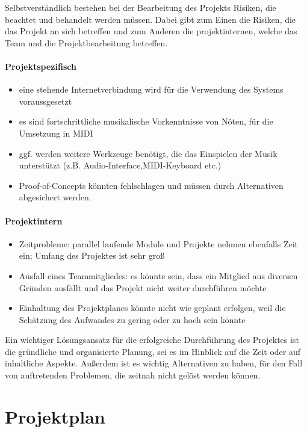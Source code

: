 \documentclass[12pt]{scrartcl}
\begin{document}


Selbstverständlich bestehen bei der Bearbeitung des Projekts Risiken, die beachtet und behandelt werden müssen. Dabei gibt zum Einen die Risiken, die das Projekt an sich betreffen und zum Anderen die projektinternen, welche das Team und die Projektbearbeitung betreffen.

\paragraph{Projektspezifisch}
\begin{itemize}
\item eine stehende Internetverbindung wird für die Verwendung des Systems voraussgesetzt
\item es sind fortschrittliche musikalische Vorkenntnisse von Nöten, für die Umsetzung in MIDI
\item ggf. werden weitere Werkzeuge benötigt, die das Einspielen der Musik unterstützt (z.B. Audio-Interface,MIDI-Keyboard etc.)
\item Proof-of-Concepts könnten fehlschlagen und müssen durch Alternativen abgesichert werden.
\end{itemize}


\paragraph{Projektintern}
\begin{itemize}
\item Zeitprobleme: parallel laufende Module und Projekte nehmen ebenfalls Zeit ein; Umfang des Projektes ist sehr groß 
\item Ausfall eines Teammitgliedes: es könnte sein, dass ein Mitglied aus diversen Gründen ausfällt und das Projekt nicht weiter durchführen möchte
\item Einhaltung des Projektplanes könnte nicht wie geplant erfolgen, weil die Schätzung des Aufwandes zu gering oder zu hoch sein könnte
\end{itemize}


Ein wichtiger Lösungsansatz für die erfolgreiche Durchführung des Projektes ist die gründliche und organisierte Planung, sei es im Hinblick auf die Zeit oder auf inhaltliche Aspekte.  Außerdem ist es wichtig Alternativen zu haben, für den Fall von auftretenden Problemen, die zeitnah nicht gelöst werden können.


\section{Projektplan}



\end{document}
